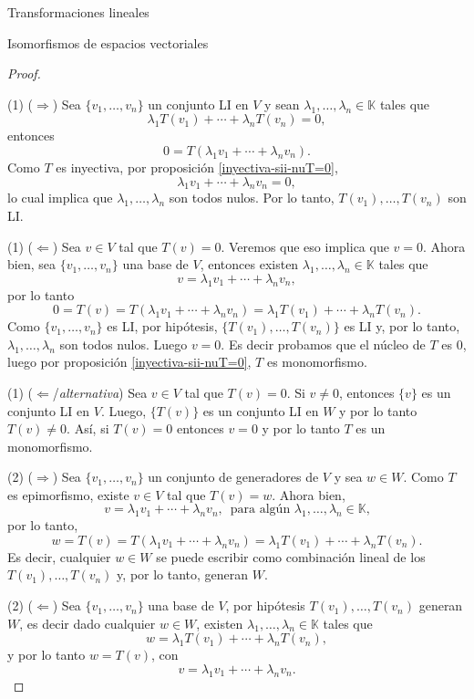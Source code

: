 \documentclass[a4paper,12pt,twoside,spanish,reqno]{amsbook}
\theoremstyle{definition}
\theoremstyle{remark}
\newcommand{\K}{\mathbb K}
\begin{document}
\begin{chapter}{Transformaciones lineales}
\begin{section}{Isomorfismos de espacios vectoriales}
\begin{proof}
			\
			
			
			(1) ($\Rightarrow$) Sea $\{v_1,\ldots,v_n \}$ un conjunto LI en $V$ y sean  $\lambda_1,\ldots,\lambda_n \in \K$ tales que
			$$
			\lambda_1T(v_1) +\cdots+ \lambda_{n}T(v_n) =0,
			$$
			entonces
			$$
			0 = T(\lambda_1v_1+\cdots + \lambda_{n}v_n).
			$$
			Como $T$  es inyectiva, por proposición \ref{inyectiva-sii-nuT=0}, 
			$$
			\lambda_1v_1+\cdots + \lambda_{n}v_n =0,
			$$
			lo cual implica que $\lambda_1,\ldots,\lambda_n$ son todos nulos. Por lo tanto,  $T(v_1),\ldots,T(v_n)$ son LI.
			
			
			(1) ($\Leftarrow$) Sea $v \in V$ tal que $T(v)=0$. Veremos que eso implica que $v =0$.  Ahora bien, sea  $\{v_1,\ldots,v_n \}$ una base de $V$,  entonces existen $\lambda_1,\ldots,\lambda_n \in \K$ tales que
			$$
			v = \lambda_1v_1+\cdots + \lambda_{n}v_n,
			$$
			por lo tanto
			$$
			0 = T(v) = T(\lambda_1v_1+\cdots + \lambda_{n}v_n) = \lambda_1T(v_1) +\cdots+ \lambda_{n}T(v_n).
			$$
			Como $\{v_1,\ldots,v_n \}$ es LI, por hipótesis, $\{T(v_1),\ldots,T(v_n)\}$ es LI y, por lo tanto, $\lambda_1,\ldots,\lambda_n$ son todos nulos. Luego $v=0$. Es decir probamos  que el núcleo de $T$ es 0, luego por proposición \ref{inyectiva-sii-nuT=0}, $T$ es monomorfismo. 

		(1) ($\Leftarrow$/\textit{alternativa}) Sea $v \in V$ tal que $T(v)=0$.	Si $v\neq 0$, entonces $\{v\}$ es un conjunto LI en $V$. Luego, $\{T(v)\}$ es un conjunto LI en $W$ y por lo tanto $T(v)\neq 0$. Así, si $T(v)=0$ entonces $v=0$ y por lo tanto $T$ es un monomorfismo.
			  
			(2) ($\Rightarrow$) Sea   $\{v_1,\ldots,v_n \}$ un conjunto de generadores de $V$ y sea  $w \in W$. Como $T$  es epimorfismo, existe $v \in V$ tal que $T(v)=w$. Ahora bien, 
			$$
			v = \lambda_1v_1+\cdots + \lambda_{n}v_n,\, \text{ para algún $\lambda_1,\ldots,\lambda_n \in \K$,}
			$$
			por lo tanto,
			$$
			w =T(v) = T(\lambda_1v_1+\cdots + \lambda_{n}v_n) = \lambda_1T(v_1) +\cdots+ \lambda_{n}T(v_n).
			$$ 
			Es decir,  cualquier $w \in W$ se puede escribir como combinación lineal de los  $T(v_1),\ldots,T(v_n)$ y, por lo tanto,  generan $W$.
			
			(2) ($\Leftarrow$) Sea $\{v_1,\ldots,v_n \}$ una base de $V$, por hipótesis $T(v_1),\ldots,T(v_n)$ generan $W$,  es decir dado cualquier $w \in W$,   existen $\lambda_1,\ldots,\lambda_n \in \K$ tales que
			$$
			w = \lambda_1T(v_1)+\cdots + \lambda_{n}T(v_n),
			$$
			y por lo tanto $w = T(v)$,  con 
			$$
			v = \lambda_1v_1+\cdots + \lambda_{n}v_n.
			$$
		\end{proof}
		

\end{section}
\end{chapter}
\end{document}
